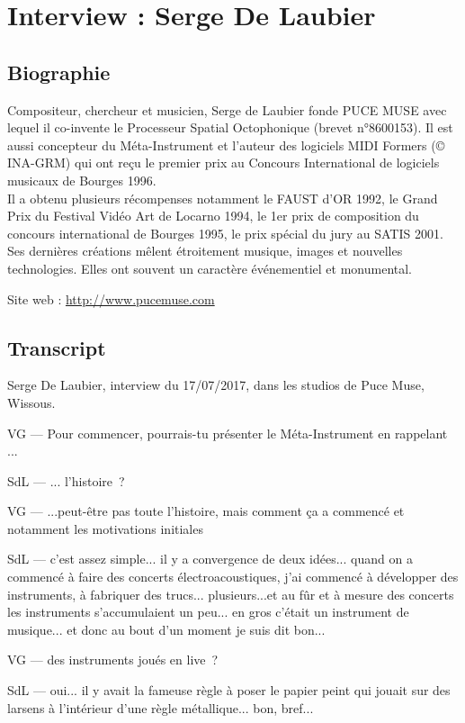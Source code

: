 \chapter{Interview : Serge De Laubier}
\label{appendix:delaubier}
\section*{Biographie}

\noindent Compositeur, chercheur et musicien, Serge de Laubier fonde PUCE MUSE avec lequel il co-invente le Processeur Spatial Octophonique (brevet n°8600153). Il est aussi concepteur du Méta-Instrument et l’auteur des logiciels MIDI Formers (© INA-GRM) qui ont reçu le premier prix au Concours International de logiciels musicaux de Bourges 1996.\\
\indent Il a obtenu plusieurs récompenses notamment le FAUST d’OR 1992, le Grand Prix du Festival Vidéo Art de Locarno 1994, le 1er prix de composition du concours international de Bourges 1995, le prix spécial du jury au SATIS 2001.\\
\indent Ses dernières créations mêlent étroitement musique, images et nouvelles technologies. Elles ont souvent un caractère événementiel et monumental.

\noindent Site web : \url{http://www.pucemuse.com}

\section*{Transcript}
\noindent Serge De Laubier, interview du 17/07/2017, dans les studios de Puce Muse, Wissous.

VG — Pour commencer, pourrais-tu présenter le Méta-Instrument en rappelant ...

SdL — ... l'histoire ? 

VG — ...peut-être pas toute l'histoire, mais comment ça a commencé et notamment les motivations initiales 

SdL — c'est assez simple... il y a convergence de deux idées... quand on a commencé à faire des concerts électroacoustiques, j'ai commencé à développer des instruments, à fabriquer des trucs... plusieurs...et au fûr et à mesure des concerts les instruments s'accumulaient un peu... en gros c'était un instrument de musique... et donc au bout d'un moment je suis dit bon... 

VG — des instruments joués en live ? 

SdL — oui... il y avait la fameuse règle à poser le papier peint qui jouait sur des larsens à l'intérieur d'une règle métallique... bon, bref... 

